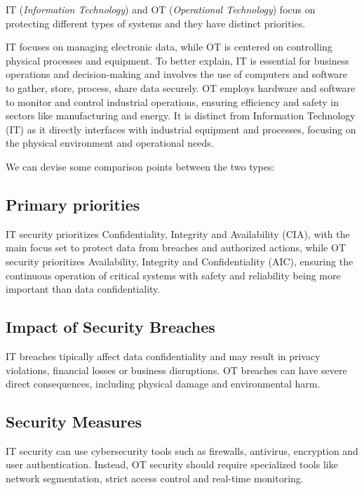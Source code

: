 IT (\textit{Information Technology}) and OT (\textit{Operational Technology}) focus on protecting different types of systems and they have distinct priorities. 

IT focuses on managing electronic data, while OT is centered on controlling physical processes and equipment. To better explain, IT is essential for business operations and decision-making and involves the use of computers and software to gather, store, process, share data securely. OT employs hardware and software to monitor and control industrial operations, ensuring efficiency and safety in sectors like manufacturing and energy. It is distinct from Information Technology (IT) as it directly interfaces with industrial equipment and processes, focusing on the physical environment and operational needs.~\cite{paloalto-it-ot-diff}

We can devise some comparison points between the two types:

\subsection{Primary priorities}

IT security prioritizes Confidentiality, Integrity and Availability (CIA), with the main focus set to protect data from breaches and authorized actions, while OT security prioritizes Availability, Integrity and Confidentiality (AIC), ensuring the continuous operation of critical systems with safety and reliability being more important than data confidentiality.

\subsection{Impact of Security Breaches}

IT breaches tipically affect data confidentiality and may result in privacy violations, financial losses or business disruptions. OT breaches can have severe direct consequences, including physical damage and environmental harm.

\subsection{Security Measures}

IT security can use cybersecurity tools such as firewalls, antivirus, encryption and user authentication. Instead, OT security should require specialized tools like network segmentation, strict access control and real-time monitoring.

